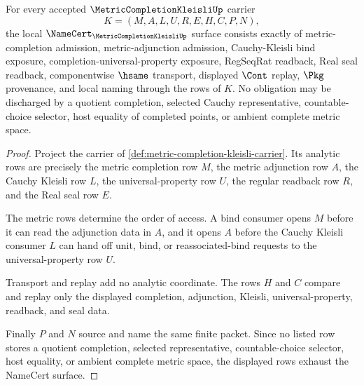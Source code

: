 \begin{theorem}
\label{thm:metric-completion-kleisli-namecert-obligations}
For every accepted $\MetricCompletionKleisliUp$ carrier
$$
K=(M,A,L,U,R,E,H,C,P,N),
$$
the local $\NameCert_{\MetricCompletionKleisliUp}$ surface consists exactly of metric-completion admission, metric-adjunction admission, Cauchy-Kleisli bind exposure, completion-universal-property exposure, RegSeqRat readback, Real seal readback, componentwise $\hsame$ transport, displayed $\Cont$ replay, $\Pkg$ provenance, and local naming through the rows of $K$. No obligation may be discharged by a quotient completion, selected Cauchy representative, countable-choice selector, host equality of completed points, or ambient complete metric space.
\end{theorem}
\begin{proof}
Project the carrier of \autoref{def:metric-completion-kleisli-carrier}. Its analytic rows are precisely the metric completion row $M$, the metric adjunction row $A$, the Cauchy Kleisli row $L$, the universal-property row $U$, the regular readback row $R$, and the Real seal row $E$.

The metric rows determine the order of access. A bind consumer opens $M$ before it can read the adjunction data in $A$, and it opens $A$ before the Cauchy Kleisli consumer $L$ can hand off unit, bind, or reassociated-bind requests to the universal-property row $U$.

Transport and replay add no analytic coordinate. The rows $H$ and $C$ compare and replay only the displayed completion, adjunction, Kleisli, universal-property, readback, and seal data.

Finally $P$ and $N$ source and name the same finite packet. Since no listed row stores a quotient completion, selected representative, countable-choice selector, host equality, or ambient complete metric space, the displayed rows exhaust the NameCert surface.
\end{proof}

